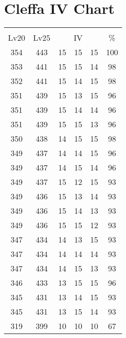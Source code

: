 \documentclass{article}%
\begin{document}
%
\normalsize%
\section{Cleffa IV Chart}%
\label{sec:Cleffa IV Chart}%
\renewcommand{\arraystretch}{1.5}%
\begin{tabular}{|c|c|c|c|c|c|}%
\hline%
\multicolumn{6}{|c|}{\textcolor{white}{ 
\linebreak{Cleffa}
}%
\cellcolor{black}}\\%
\multicolumn{1}{|c}{Lv20}&\multicolumn{1}{c|}{Lv25}&\multicolumn{3}{c|}{IV}&\multicolumn{1}{|c|}{\%}\\%
\hline%
\rowcolor{color100}%
354&443&15&15&15&100\\%
\hline%
\rowcolor{color98}%
353&441&15&15&14&98\\%
\hline%
\rowcolor{color98}%
352&441&15&14&15&98\\%
\hline%
\rowcolor{color96}%
351&439&15&13&15&96\\%
\hline%
\rowcolor{color96}%
351&439&15&14&14&96\\%
\hline%
\rowcolor{color96}%
351&439&15&15&13&96\\%
\hline%
\rowcolor{color98}%
350&438&14&15&15&98\\%
\hline%
\rowcolor{color96}%
349&437&14&14&15&96\\%
\hline%
\rowcolor{color96}%
349&437&14&15&14&96\\%
\hline%
\rowcolor{color93}%
349&437&15&12&15&93\\%
\hline%
\rowcolor{color93}%
349&436&15&13&14&93\\%
\hline%
\rowcolor{color93}%
349&436&15&14&13&93\\%
\hline%
\rowcolor{color93}%
349&436&15&15&12&93\\%
\hline%
\rowcolor{color93}%
347&434&14&13&15&93\\%
\hline%
\rowcolor{color93}%
347&434&14&14&14&93\\%
\hline%
\rowcolor{color93}%
347&434&14&15&13&93\\%
\hline%
\rowcolor{color96}%
346&433&13&15&15&96\\%
\hline%
\rowcolor{color93}%
345&431&13&14&15&93\\%
\hline%
\rowcolor{color93}%
345&431&13&15&14&93\\%
\hline%
\rowcolor{color91}%
319&399&10&10&10&67\\%
\end{tabular}

%
\end{document}
